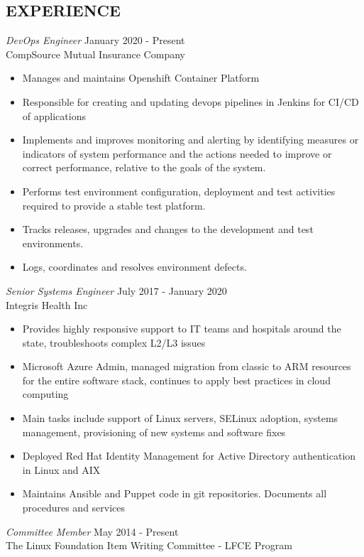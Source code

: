 \documentclass[margin]{res}
\begin{document}
\begin{resume}
\section{EXPERIENCE}
	{\sl DevOps Engineer} \hfill January 2020 - Present \\
	CompSource Mutual Insurance Company
	\begin{itemize} \itemsep -2pt 
	\item Manages and maintains Openshift Container Platform
	\item Responsible for creating and updating devops pipelines in Jenkins for CI/CD of applications
	\item Implements and improves monitoring and alerting by identifying measures or indicators of system performance and the actions needed to improve or correct performance, relative to the goals of the system.
	\item Performs test environment configuration, deployment and test activities required to provide a stable test platform.
	\item Tracks releases, upgrades and changes to the development and test environments.
	\item Logs, coordinates and resolves environment defects.
	\end{itemize}
	{\sl Senior Systems Engineer} \hfill July 2017 - January 2020 \\
	Integris Health Inc
	\begin{itemize}  \itemsep -2pt %
	\item Provides highly responsive support to IT teams and hospitals around the state, troubleshoots complex L2/L3 issues
	\item Microsoft Azure Admin, managed migration from classic to ARM resources for the entire software stack, continues to apply best practices in cloud computing
	\item Main tasks include support of Linux servers, SELinux adoption, systems management, provisioning of new systems and software fixes
	\item Deployed Red Hat Identity Management for Active Directory authentication in Linux and AIX
	\item Maintains Ansible and Puppet code in git repositories. Documents all procedures and services
	\end{itemize}
	{\sl Committee Member} \hfill May 2014 - Present \\
    The Linux Foundation Item Writing Committee - LFCE Program
    \begin{itemize}  \itemsep -2pt %

\end{itemize}
\end{resume}
\end{document}
